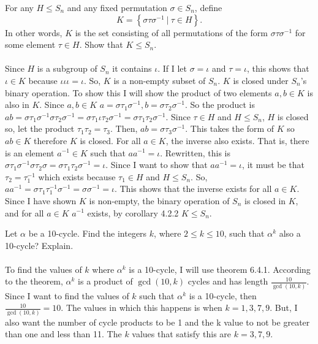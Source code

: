 \documentclass[titlepage]{article}
\newenvironment{problem}[2][Problem]{\begin{trivlist}
\item[\hskip \labelsep {\bfseries #1}\hskip \labelsep {\bfseries #2.}]}{\end{trivlist}}
\begin{document}
\begin{problem}{6}
For any $H\leq S_n$ and any fixed permutation $\sigma \in S_n$, define 
$$K = \left\{\sigma\tau\sigma^{-1} \ | \ \tau \in H \right\}.$$
In other words, $K$ is the set consisting of all permutations of the form $\sigma\tau\sigma^{-1}$ for some element $\tau \in H$. Show that $K \leq S_n$. 
\\ \\
Since $H$ is a subgroup of $S_n$ it contains $\iota$. If I let $\sigma = \iota$ and $\tau = \iota$, this shows that $\iota \in K$ because $\iota\iota\iota = \iota$. So, $K$ is a non-empty subset of $S_n$. $K$ is closed under $S_n$'s binary operation. To show this I will show the product of two elements $a,b \in K$ is also in $K$. Since $a,b \in K$ $a =\sigma \tau_1 \sigma^{-1}, b = \sigma \tau_2 \sigma^{-1}$. So the product is $ab = \sigma \tau_1 \sigma^{-1}\sigma \tau_2 \sigma^{-1} = \sigma \tau_1 \iota \tau_2 \sigma^{-1} = \sigma \tau_1 \tau_2 \sigma^{-1}$. Since $\tau \in H$ and $H \leq S_n$, $H$ is closed so, let the product $\tau_1 \tau_2 = \tau_3$. Then, $ab = \sigma \tau_3 \sigma^{-1}$. This takes the form of $K$ so $ab \in K$ therefore $K$ is closed. For all $a \in K$, the inverse also exists. That is, there is an element $a^{-1} \in K$ such that $aa^{-1} = \iota$. Rewritten, this is $\sigma \tau_1 \sigma^{-1} \sigma \tau_2 \sigma = \sigma \tau_1 \tau_2 \sigma^{-1} = \iota$. Since I want to show that $aa^{-1} = \iota$, it must be that $\tau_2 = \tau_1^{-1}$ which exists because $\tau_1 \in H$ and $H \leq S_n$. So, $aa^{-1} = \sigma\tau_1\tau_1^{-1}\sigma^{-1} = \sigma\sigma^{-1} = \iota$. This shows that the inverse exists for all $a \in K$. Since I have shown $K$ is non-empty, the binary operation of $S_n$ is closed in $K$, and for all $a \in K$ $a^{-1}$ exists, by corollary 4.2.2 $K \leq S_n$. 

\end{problem}

\begin{problem}{7}
Let $\alpha$ be a 10-cycle. Find the integers $k$, where $2 \leq k \leq 10$, such that $\alpha^k$ also a 10-cycle? Explain.	
\\ \\
To find the values of $k$ where $\alpha^k$ is a 10-cycle, I will use theorem 6.4.1. According to the theorem, $\alpha^k$ is a product of $\gcd(10,k)$ cycles and has length $\frac{10}{\gcd(10,k)}$. Since I want to find the values of $k$ such that $\alpha^k$ is a 10-cycle, then $\frac{10}{\gcd(10,k)} = 10.$ The values in which this happens is when $k=1,3,7,9$. But, I also want the number of cycle products to be 1 and the k value to not be greater than one and less than 11. The $k$ values that satisfy this are $k = 3,7,9$. 
\end{problem}
\end{document}

